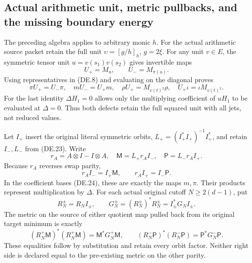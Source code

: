 \subsection{Actual arithmetic unit, metric pullbacks, and the missing boundary energy}

The preceding algebra applies to arbitrary monic \(h\). For the actual arithmetic source packet retain the full unit \(\upsilon=[g/h]_h\), \(g=2\xi\). For any unit \(v\in E\), the symmetric tensor unit \(u=v(s_1)v(s_2)\) gives invertible maps
\[
 U_+=M_u,\qquad U_-=M_{\pi(u)}.
\]
Using representatives in (DE.8) and evaluating on the diagonal proves
\[
 \pi U_+=U_-\pi,\quad mU_-=U_+m,\quad
 \rho U_+=M_{v(t)^2}\rho,\quad U_+\iota=\iota M_{v(t)^2}.
 \tag{DE.28}
\]
For the last identity \(\Delta H_1=0\) allows only the multiplying coefficient of \(uH_1\) to be evaluated at \(\Delta=0\). Thus both defects retain the full squared unit with all jets, not reduced values.

Let \(I_+\) insert the original literal symmetric orbits, \(L_+=(I_+^*I_+)^{-1}I_+^*\), and retain \(I_-,L_-\) from (DE.23). Write
\[
 r_A=A\otimes I-I\otimes A,\quad
 \mathsf M=L_+r_AI_-,\quad\mathsf P=L_-r_AI_+.
 \tag{DE.29}
\]
Because \(r_A\) reverses swap parity,
\[
 r_AI_-=I_+\mathsf M,\qquad r_AI_+=I_-\mathsf P.
\]
In the coefficient bases (DE.24), these are exactly the maps \(m,\pi\). Their products represent multiplication by \(\Delta\). For each actual original cutoff \(N\ge2(d-1)\), put
\[
 R_N^\pm=R_NI_\pm,\qquad G_N^\pm=(R_N^\pm)^*R_N^\pm=I_\pm^*G_NI_\pm.
\]
The metric on the source of either quotient map pulled back from its original target minimum is exactly
\[
 (R_N^+\mathsf M)^*(R_N^+\mathsf M)=\mathsf M^*G_N^+\mathsf M,\qquad
 (R_N^-\mathsf P)^*(R_N^-\mathsf P)=\mathsf P^*G_N^-\mathsf P.
 \tag{DE.30}
\]
These equalities follow by substitution and retain every orbit factor. Neither right side is declared equal to the pre-existing metric on the other parity.

